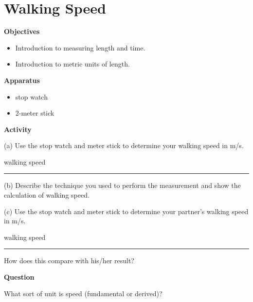 
\section{Walking Speed}

\makelabheader %

\textbf{Objectives}

\begin{itemize}
\item Introduction to measuring length and time.
\item Introduction to metric units of length. 
\end{itemize}
\textbf{Apparatus}

\begin{itemize}
\item stop watch
\item 2-meter stick
\end{itemize}
\textbf{Activity}

(a) Use the stop watch and meter stick to determine your walking speed in m/s.

walking speed \rule{2.0in}{0.1pt}

(b) Describe the technique you used to perform the measurement and show the calculation of walking speed.
\vspace{30mm}

(c) Use the stop watch and meter stick to determine your partner's walking speed in m/s.

walking speed \rule{2.0in}{0.1pt}  How does this compare with his/her result?
\vspace{20mm}

\textbf{Question}

What sort of unit is speed (fundamental or derived)?

